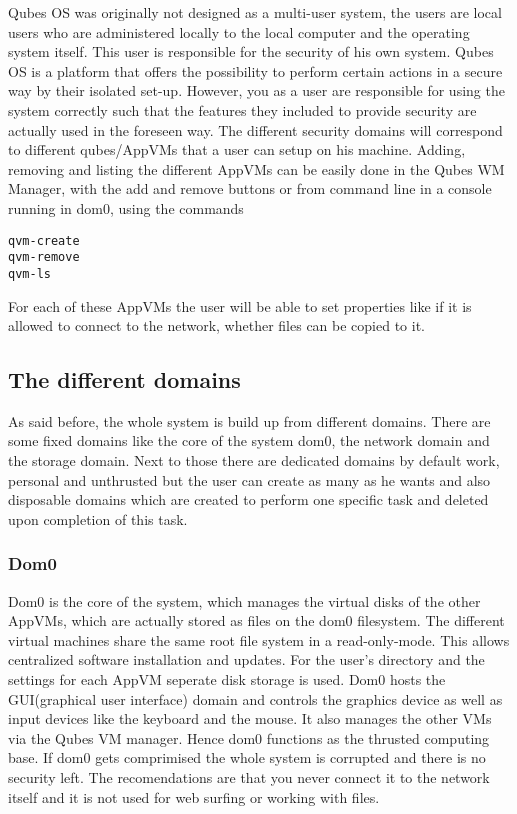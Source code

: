 \documentclass[runningheads,a4paper]{article}
\begin{document}
Qubes OS was originally not designed
as a multi-user system, the users are local users who are administered
locally to the local computer and the operating system itself. This
user is responsible for the security of his own system. Qubes OS is a platform that
offers the possibility to perform certain actions in a secure way by
their isolated set-up. However, you as a user are responsible for
using the system correctly such that the features they included to
provide security are actually used in the foreseen way. The different
security domains will correspond to different qubes/AppVMs that a user
can setup on his machine. Adding, removing and listing the different
AppVMs can be easily done in the Qubes WM Manager, with the add and
remove buttons or from command line in a console running in dom0,
using the commands
\begin{verbatim}
qvm-create
qvm-remove
qvm-ls
\end{verbatim}
For each of these AppVMs the user will be able to set properties like if
it is allowed to connect to the network, whether files can be copied
to it. 


\subsection{The different domains}
As said before, the whole system is build up from different
domains. There are some fixed domains like the core of the system
dom0, the network domain and the storage domain. Next to those there
are dedicated domains by default work, personal and unthrusted but the
user can create as many as he wants and also disposable domains which
are created to perform one specific task and deleted upon completion
of this task.

\subsubsection{Dom0}

Dom0 is the core of the system, which manages the virtual disks of the
other AppVMs, which are actually stored as files on the dom0
filesystem. The different virtual machines share the same root file
system in a read-only-mode. This allows centralized software
installation and updates. For the user's directory and the settings
for each AppVM seperate disk storage is used. 
Dom0  hosts the GUI(graphical user interface) domain and controls the
graphics device as well as input devices like the keyboard and the
mouse. It also
manages the other VMs via the Qubes VM manager. Hence dom0 functions as the thrusted computing base. If dom0
gets comprimised the whole system is corrupted and there is no
security left. The recomendations are that you never connect it to the
network itself and it is not used for web surfing or working with
files.
\end{document}

